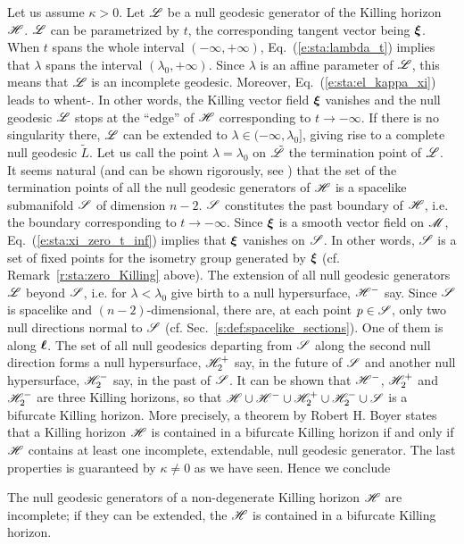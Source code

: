 Let us assume $\kappa>0$. Let $\mathscr{L}$ be a null geodesic generator of the Killing
horizon $\mathscr{H}$. $\mathscr{L}$ can be parametrized by $t$, the corresponding
tangent vector being $\bm{\xi}$. When $t$ spans the whole interval $(-\infty,+\infty)$,
Eq.~(\ref{e:sta:lambda_t}) implies that $\lambda$ spans the
interval $(\lambda_0,+\infty)$. Since $\lambda$ is an affine parameter of $\mathscr{L}$,
this means that $\mathscr{L}$ is an incomplete geodesic.
Moreover, Eq.~(\ref{e:sta:el_kappa_xi}) leads to
\be \label{e:sta:xi_zero_t_inf}
    \w{\xi}  \quad\mbox{when}\quad t\rightarrow -\infty .
\ee
In other words, the Killing vector field $\bm{\xi}$ vanishes and
the null geodesic $\mathscr{L}$ stops at the ``edge'' of $\mathscr{H}$ corresponding to
$t\rightarrow -\infty$. If there is no singularity there, $\mathscr{L}$ can be
extended to $\lambda\in(-\infty,\lambda_0]$, giving rise to a complete
null geodesic $\tilde L$. Let us call the point $\lambda=\lambda_0$
on $\tilde{\mathscr{L}}$ the termination point of $\mathscr{L}$. It seems natural (and can be
shown rigorously, see \cite{Boyer69}) that the set of the termination points of all the null geodesic generators of $\mathscr{H}$ is a
spacelike submanifold $\mathscr{S}$ of dimension $n-2$. $\mathscr{S}$ constitutes the past
boundary of $\mathscr{H}$, i.e. the boundary corresponding to $t\rightarrow -\infty$.
Since $\bm{\xi}$ is a smooth vector field on $\mathscr{M}$, Eq.~(\ref{e:sta:xi_zero_t_inf})
implies that $\bm{\xi}$ vanishes on $\mathscr{S}$.
In other words, $\mathscr{S}$ is a set of fixed points for the isometry group generated
by $\bm{\xi}$ (cf. Remark~\ref{r:sta:zero_Killing} above).
The extension of all null geodesic generators $\mathscr{L}$ beyond $\mathscr{S}$, i.e. for
$\lambda < \lambda_0$ give birth to a null hypersurface, $\mathscr{H}^-$ say.
Since $\mathscr{S}$ is spacelike and $(n-2)$-dimensional, there are, at each point
$p\in\mathscr{S}$, only two null directions normal to $\mathscr{S}$ (cf. Sec.~\ref{s:def:spacelike_sections}). One of them is along $\bm{\ell}$. The set of all null geodesics
departing from $\mathscr{S}$ along the second null direction forms a null hypersurface,
$\mathscr{H}_2^+$ say, in the future of $\mathscr{S}$ and another null hypersurface, $\mathscr{H}_2^-$
say, in the past of $\mathscr{S}$. It can be shown that $\mathscr{H}^-$, $\mathscr{H}_2^+$ and $\mathscr{H}_2^-$
are three Killing horizons, so that $\mathscr{H}\cup\mathscr{H}^-\cup\mathscr{H}_2^+\cup\mathscr{H}_2^-\cup\mathscr{S}$
is a bifurcate Killing horizon.
More precisely, a theorem by Robert H. Boyer \cite{Boyer69} states that
a Killing horizon $\mathscr{H}$ is contained in a bifurcate Killing horizon if and
only if $\mathscr{H}$ contains at least one incomplete, extendable, null geodesic
generator. The last properties is guaranteed by $\kappa\not=0$ as we have seen.
Hence we conclude
\begin{greybox}
The null geodesic generators of a non-degenerate Killing horizon $\mathscr{H}$ are
incomplete; if they can be extended, the $\mathscr{H}$ is contained in a
bifurcate Killing horizon.
\end{greybox}




